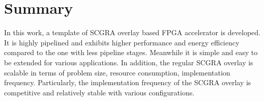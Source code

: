 \section{Summary}
In this work, a template of SCGRA overlay based FPGA accelerator is developed. It is highly pipelined and exhibits higher performance and energy efficiency compared to the one with less pipeline stages. Meanwhile it is simple and easy to be extended for various applications. In addition, the regular SCGRA overlay is scalable in terms of problem size, resource consumption, implementation frequency. Particularly, the implementation frequency of the SCGRA overlay is competitive and relatively stable with various configurations.


